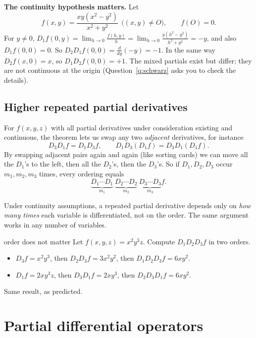 \begin{extra}
\textbf{The continuity hypothesis matters.} Let
\[ f(x,y)=\frac{xy(x^2-y^2)}{x^2+y^2}\ \ \big((x,y)\neq O\big),\qquad f(O)=0 . \]
For $y\neq0$, $D_1f(0,y)=\lim_{h\to0}\frac{f(h,y)}{h}=\lim_{h\to0}\frac{y(h^2-y^2)}{h^2+y^2}=-y$,
and also $D_1f(0,0)=0$. So $D_2D_1f(0,0)=\frac{d}{dy}(-y)=-1$. In the same way
$D_2f(x,0)=x$, so $D_1D_2f(0,0)=+1$. The mixed partials exist but differ; they are not
continuous at the origin (Question~\ref{q:schwarz} asks you to check the details).
\end{extra}

\subsection{Higher repeated partial derivatives}

For $f(x,y,z)$ with all partial derivatives under consideration existing and continuous,
the theorem lets us swap any two \emph{adjacent} derivatives, for instance
\[ D_3D_1f=D_1D_3f,\qquad D_1D_3(D_1f)=D_3D_1(D_1f). \]
By swapping adjacent pairs again and again (like sorting cards) we can move all the $D_1$'s
to the left, then all the $D_2$'s, then the $D_3$'s. So if $D_1,D_2,D_3$ occur $m_1,m_2,m_3$
times, every ordering equals
\[ \underbrace{D_1\cdots D_1}_{m_1}\ \underbrace{D_2\cdots D_2}_{m_2}\ \underbrace{D_3\cdots D_3}_{m_3}f . \]

\begin{keyidea}
Under continuity assumptions, a repeated partial derivative depends only on \emph{how many
times} each variable is differentiated, not on the order. The same argument works in any
number of variables.
\end{keyidea}

\begin{example}{order does not matter}
Let $f(x,y,z)=x^2y^3z$. Compute $D_1D_2D_3f$ in two orders.
\begin{itemize}
  \item $D_3f=x^2y^3$, then $D_2D_3f=3x^2y^2$, then $D_1D_2D_3f=6xy^2$.
  \item $D_1f=2xy^3z$, then $D_3D_1f=2xy^3$, then $D_2D_3D_1f=6xy^2$.
\end{itemize}
Same result, as predicted.
\end{example}

\section{Partial differential operators}

